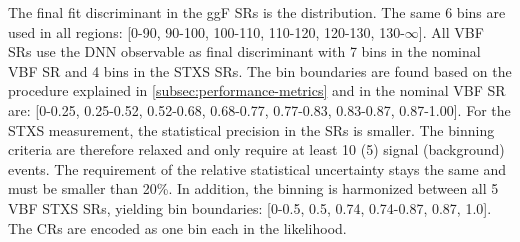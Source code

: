 The final fit discriminant in the ggF SRs is the \mT distribution. The same 6 bins are used in all regions: [0-90, 90-100, 100-110, 110-120, 120-130, 130-$\infty$]. 
All VBF SRs use the DNN observable as final discriminant with 7 bins in the nominal VBF SR and 4 bins in the STXS SRs.
The bin boundaries are found based on the procedure explained in \cref{subsec:performance-metrics} and in the nominal VBF SR are: [0-0.25, 0.25-0.52, 0.52-0.68, 0.68-0.77, 0.77-0.83, 0.83-0.87, 0.87-1.00].
For the STXS measurement, the statistical precision in the SRs is smaller. The binning criteria are therefore relaxed and only require at least 10 (5) signal (background) events. The requirement of the relative statistical uncertainty stays the same and must be smaller than 20\%. In addition, the binning is harmonized between all 5 VBF STXS SRs, yielding bin boundaries: [0-0.5, 0.5, 0.74, 0.74-0.87, 0.87, 1.0]. 
The CRs are encoded as one bin each in the likelihood. 


